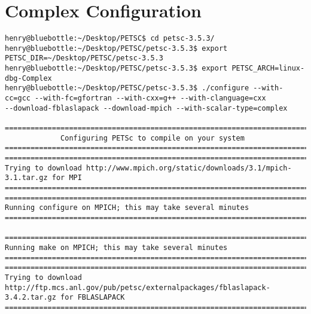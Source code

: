 \documentclass{article}
\begin{document}
\section{Complex Configuration}
\begin{scriptsize}\begin{verbatim}
henry@bluebottle:~/Desktop/PETSC$ cd petsc-3.5.3/
henry@bluebottle:~/Desktop/PETSC/petsc-3.5.3$ export PETSC_DIR=~/Desktop/PETSC/petsc-3.5.3
henry@bluebottle:~/Desktop/PETSC/petsc-3.5.3$ export PETSC_ARCH=linux-dbg-Complex
henry@bluebottle:~/Desktop/PETSC/petsc-3.5.3$ ./configure --with-cc=gcc --with-fc=gfortran --with-cxx=g++ --with-clanguage=cxx
--download-fblaslapack --download-mpich --with-scalar-type=complex

===============================================================================
             Configuring PETSc to compile on your system                       
===============================================================================
===============================================================================                                                                                                        Trying to download http://www.mpich.org/static/downloads/3.1/mpich-3.1.tar.gz for MPI                                                                                      ===============================================================================                                                                                                  ===============================================================================                                                                                                        Running configure on MPICH; this may take several minutes                                                                                                                  ===============================================================================                                                            
                                      ===============================================================================                                                                                                        Running make on MPICH; this may take several minutes                                                                                                                       ===============================================================================                                                                                                  ===============================================================================                                                                                                        Trying to download http://ftp.mcs.anl.gov/pub/petsc/externalpackages/fblaslapack-3.4.2.tar.gz for FBLASLAPACK                                                              ===============================================================================                      

\end{verbatim}
\end{scriptsize}
\end{document}
